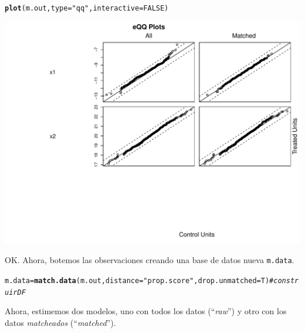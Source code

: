 \documentclass[onesided]{article}\usepackage[]{graphicx}\usepackage[]{color}
\makeatletter
\def\maxwidth{ %
  \ifdim\Gin@nat@width>\linewidth
    \linewidth
  \else
    \Gin@nat@width
  \fi
}
\newcommand{\hlnum}[1]{\textcolor[rgb]{0.686,0.059,0.569}{#1}}%
\newcommand{\hlstr}[1]{\textcolor[rgb]{0.192,0.494,0.8}{#1}}%
\newcommand{\hlcom}[1]{\textcolor[rgb]{0.678,0.584,0.686}{\textit{#1}}}%
\newcommand{\hlstd}[1]{\textcolor[rgb]{0.345,0.345,0.345}{#1}}%
\newcommand{\hlkwb}[1]{\textcolor[rgb]{0.69,0.353,0.396}{#1}}%
\newcommand{\hlkwc}[1]{\textcolor[rgb]{0.333,0.667,0.333}{#1}}%
\newcommand{\hlkwd}[1]{\textcolor[rgb]{0.737,0.353,0.396}{\textbf{#1}}}%
\newenvironment{kframe}{%
 \def\at@end@of@kframe{}%
 \ifinner\ifhmode%
  \def\at@end@of@kframe{\end{minipage}}%
  \begin{minipage}{\columnwidth}%
 \fi\fi%
 \def\FrameCommand##1{\hskip\@totalleftmargin \hskip-\fboxsep
 \colorbox{shadecolor}{##1}\hskip-\fboxsep
     \hskip-\linewidth \hskip-\@totalleftmargin \hskip\columnwidth}%
 \MakeFramed {\advance\hsize-\width
   \@totalleftmargin\z@ \linewidth\hsize
   \@setminipage}}%
 {\par\unskip\endMakeFramed%
 \at@end@of@kframe}
\newenvironment{knitrout}{}{} %
\makeatother
\begin{document}
\begin{knitrout}
{}


\begin{kframe}\begin{alltt}
\hlkwd{plot}\hlstd{(m.out,} \hlkwc{type} \hlstd{=} \hlstr{"qq"}\hlstd{,} \hlkwc{interactive} \hlstd{=} \hlnum{FALSE}\hlstd{)}
\end{alltt}
\end{kframe}

{\centering \includegraphics[width=\maxwidth]{figure/sim:6-3} 

}



\end{knitrout}

OK. Ahora, botemos las observaciones creando una base de datos nueva \texttt{m.data}.

\begin{knitrout}
\color{fgcolor}\begin{kframe}
\begin{alltt}
\hlstd{m.data} \hlkwb{=} \hlkwd{match.data}\hlstd{(m.out,} \hlkwc{distance} \hlstd{=} \hlstr{"prop.score"}\hlstd{,} \hlkwc{drop.unmatched} \hlstd{= T)} \hlcom{# construir DF}
\end{alltt}
\end{kframe}
\end{knitrout}

Ahora, estimemos dos modelos, uno con todos los datos (``\emph{raw}'') y otro con los datos \emph{matcheados} (``\emph{matched}'').
\end{document}
